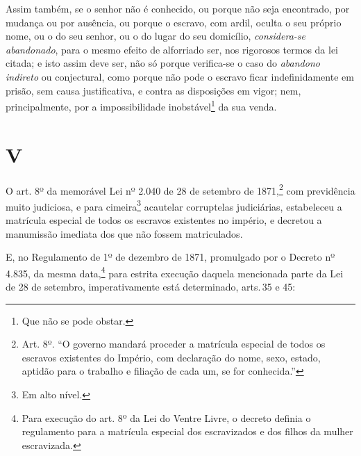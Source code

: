 Assim também, se o senhor não é conhecido, ou porque não seja
encontrado, por mudança ou por ausência, ou porque o escravo, com ardil,
oculta o seu próprio nome, ou o do seu senhor, ou o do lugar do seu
domicílio, \emph{considera-se abandonado}, para o mesmo efeito de
alforriado ser, nos rigorosos termos da lei citada; e isto assim deve
ser, não só porque verifica-se o caso do \emph{abandono indireto} ou
conjectural, como porque não pode o escravo ficar indefinidamente em
prisão, sem causa justificativa, e contra as disposições em vigor; nem,
principalmente, por a impossibilidade inobstável\footnote{Que não se
  pode obstar.} da sua venda.

\section*{V}

O art. 8º da memorável Lei nº 2.040 de 28 de setembro de 1871,\footnote{
  Art. 8º. ``O governo mandará proceder a matrícula especial de todos os
  escravos existentes do Império, com declaração do nome, sexo, estado,
  aptidão para o trabalho e filiação de cada um, se for conhecida.''} com
previdência muito judiciosa, e para cimeira\footnote{Em alto nível.}
acautelar corruptelas judiciárias, estabeleceu a matrícula especial de
todos os escravos existentes no império, e decretou a manumissão
imediata dos que não fossem matriculados.

E, no Regulamento de 1º de dezembro de 1871, promulgado por o Decreto nº
4.835, da mesma data,\footnote{Para execução do art. 8º da Lei do Ventre Livre, o decreto definia o regulamento para a matrícula
  especial dos escravizados e dos filhos da mulher escravizada.} para
estrita execução daquela mencionada parte da Lei de 28 de setembro,
imperativamente está determinado, arts.\,35 e 45:

